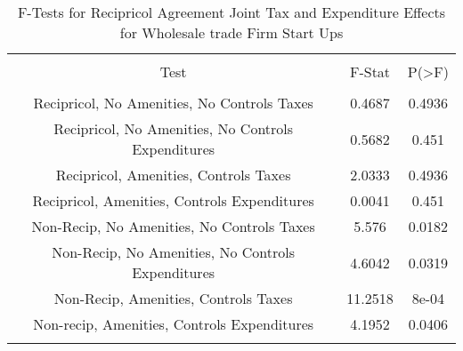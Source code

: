 
\begin{table}[!htbp] \centering 
  \caption{F-Tests for Recipricol Agreement Joint Tax and Expenditure Effects for Wholesale trade Firm Start Ups} 
  \label{42Ftests} 
\begin{tabular}{@{\extracolsep{5pt}} ccc} 
\\[-1.8ex]\hline 
\hline \\[-1.8ex] 
Test & F-Stat & P(\textgreater F) \\ 
\hline \\[-1.8ex] 
Recipricol, No Amenities, No Controls Taxes & 0.4687 & 0.4936 \\ 
Recipricol, No Amenities, No Controls Expenditures & 0.5682 & 0.451 \\ 
Recipricol, Amenities, Controls Taxes & 2.0333 & 0.4936 \\ 
Recipricol, Amenities, Controls Expenditures & 0.0041 & 0.451 \\ 
Non-Recip, No Amenities, No Controls Taxes & 5.576 & 0.0182 \\ 
Non-Recip, No Amenities, No Controls Expenditures & 4.6042 & 0.0319 \\ 
Non-Recip, Amenities, Controls Taxes & 11.2518 & 8e-04 \\ 
Non-recip, Amenities, Controls Expenditures & 4.1952 & 0.0406 \\ 
\hline \\[-1.8ex] 
\end{tabular} 
\end{table} 

